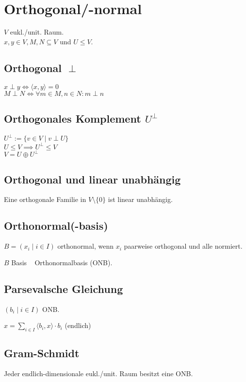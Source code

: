 \section*{Orthogonal/-normal}
$V$ eukl./unit. Raum. \\
$x,y\in V,M,N\subseteq V$ und $U \le V$.

\subsection*{Orthogonal $\perp$}
$x\perp y \iff \langle x,y \rangle = 0$ \\
$M \perp N \iff \forall m\in M, n\in N: m \perp n$

\subsection*{Orthogonales Komplement $U^\perp$}
$U^\perp := \{v \in V \mid v \perp U\}$ \\
$U \le V \implies U^\perp \le V$ \\
$V = U \oplus U^\perp$

\subsection*{Orthogonal und linear unabhängig}
Eine orthogonale Familie in $V\setminus\{0\}$ ist linear unabhängig.

\subsection*{Orthonormal(-basis)}
$B=(x_i \mid i\in I)$ orthonormal, wenn
$x_i$ paarweise orthogonal und alle normiert.

$B$ Basis \rightarrow~ Orthonormalbasis (ONB).

\subsection*{Parsevalsche Gleichung}
$(b_i \mid i\in I)$ ONB.

$\displaystyle x=\sum_{i\in I}\langle b_i,x \rangle\cdot b_i$ (endlich)

\subsection*{Gram-Schmidt}
Jeder endlich-dimensionale eukl./unit. Raum besitzt eine ONB.

